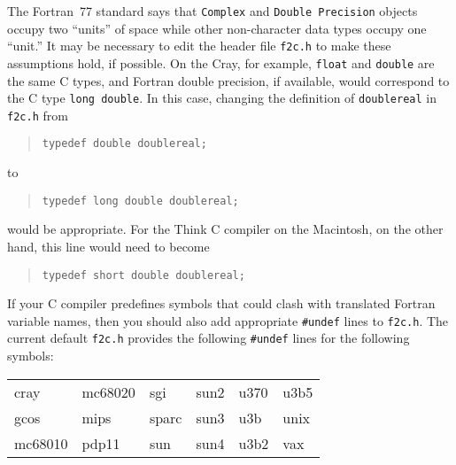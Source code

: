 \documentclass[12pt]{article}
\begin{document}
The Fortran~77 standard says that \verb|Complex| and \verb|Double Precision| objects occupy two ``units'' of space while other non-character data types occupy one ``unit.'' It may be necessary to edit the header file \verb|f2c.h| to make these assumptions hold, if possible. On the Cray, for example, \verb|float| and \verb|double| are the same C types, and Fortran double precision, if available, would correspond to the C type \verb|long double|. In this case, changing the definition of \verb|doublereal| in \verb|f2c.h| from
\begin{quote}
\begin{verbatim}
typedef double doublereal;
\end{verbatim}
\end{quote}
to
\begin{quote}
\begin{verbatim}
typedef long double doublereal;
\end{verbatim}
\end{quote}
would be appropriate. For the Think C compiler on the Macintosh, on the other hand, this line would need to become
\begin{quote}
\begin{verbatim}
typedef short double doublereal;
\end{verbatim}
\end{quote}

If your C compiler predefines symbols that could clash with translated Fortran variable names, then you should also add appropriate \verb|#undef| lines to \verb|f2c.h|. The current default \verb|f2c.h| provides the following \verb|#undef| lines for the following symbols:
\begin{center}
\begin{ttfamily}
  \begin{tabular}{llllll}
    cray    & mc68020 & sgi   & sun2 & u370 & u3b5 \\
    gcos    & mips    & sparc & sun3 & u3b  & unix \\
    mc68010 & pdp11   & sun   & sun4 & u3b2 & vax
  \end{tabular}
\end{ttfamily}
\end{center}
\end{document}
